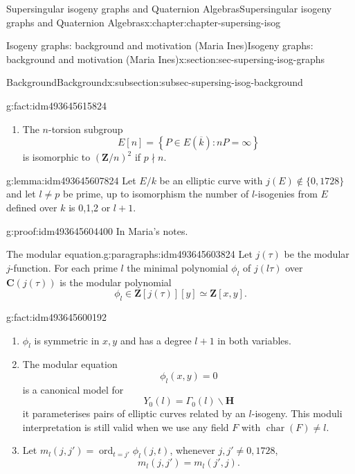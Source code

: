 \documentclass[oneside,10pt,]{book}
\numberwithin{equation}{section}
\newcommand{\lb}{[}
\newcommand{\rb}{]}
\newcommand{\ZZ}{\mathbf{Z}}
\newcommand{\CC}{\mathbf{C}}
\newcommand{\HH}{\mathbf{H}}
\DeclareMathOperator{\characteristic}{char}
\DeclareMathOperator{\ord}{ord}
\begin{document}
\begin{chapterptx}{Supersingular isogeny graphs and Quaternion Algebras}{}{Supersingular isogeny graphs and Quaternion Algebras}{}{}{x:chapter:chapter-supersing-isog}
\begin{sectionptx}{Isogeny graphs: background and motivation (Maria Ines)}{}{Isogeny graphs: background and motivation (Maria Ines)}{}{}{x:section:sec-supersing-isog-graphs}
\begin{subsectionptx}{Background}{}{Background}{}{}{x:subsection:subsec-supersing-isog-background}
\begin{fact}{}{}{g:fact:idm493645615824}
\begin{enumerate}
\begin{equation*}
\end{equation*}
the multiplication-by-\(n \) map.%
\item{}The \(n\)-torsion subgroup%
\begin{equation*}
E\lb n \rb = \left\{ P \in E(\overline k) : nP = \infty\right\}
\end{equation*}
is isomorphic to \((\ZZ/n)^2\) if \(p\nmid n\).%
\end{enumerate}
%
\end{fact}
\begin{lemma}{}{}{g:lemma:idm493645607824}%
Let \(E/k\) be an elliptic curve with \(j(E) \not\in\{0,1728\}\) and let \(l\ne p\) be prime, up to isomorphism the number of \(l\)-isogenies from \(E\) defined over \(k\) is 0,1,2 or \(l+1\).%
\end{lemma}
\begin{proofptx}{}{g:proof:idm493645604400}
In Maria's notes.%
\end{proofptx}
\begin{paragraphs}{The modular equation.}{g:paragraphs:idm493645603824}%
Let \(j(\tau)\) be the modular \(j\)-function. For each prime \(l\) the minimal polynomial \(\phi_l\) of \(j(l\tau)\) over \(\CC (j(\tau))\) is the modular polynomial%
\begin{equation*}
\phi_l \in \ZZ[j(\tau)][y] \simeq \ZZ[x,y]\text{.}
\end{equation*}
%
\begin{fact}{}{}{g:fact:idm493645600192}%
%
\begin{enumerate}
\item{}\(\phi_l\) is symmetric in \(x,y\) and has a degree \(l+1\) in both variables.%
\item{}The modular equation%
\begin{equation*}
\phi_l (x,y) = 0
\end{equation*}
is a canonical model for%
\begin{equation*}
Y_0(l) = \Gamma_0(l) \backslash \HH
\end{equation*}
it parameterises pairs of elliptic curves related by an \(l\)-isogeny. This moduli interpretation is still valid when we use any field \(F\) with \(\characteristic(F) \ne l\).%
\item{}Let \(m_l(j,j') = \ord_{t = j'} \phi_l(j,t)\), whenever \(j,j' \ne 0,1728\),%
\begin{equation*}
m_l(j,j') = m_l(j',j)\text{.}
\end{equation*}
%
\end{enumerate}
%
\end{fact}

\end{paragraphs}
\end{subsectionptx}
\end{sectionptx}
\end{chapterptx}
\end{document}
